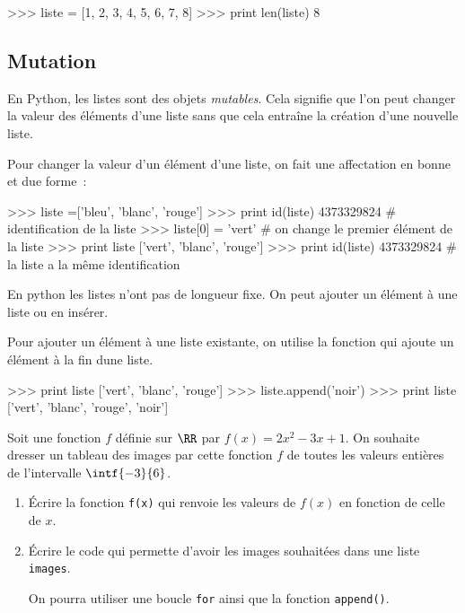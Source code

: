 \begin{pythoncode}
>>> liste = [1, 2, 3, 4, 5, 6, 7, 8]
>>> print len(liste)
8
\end{pythoncode}



\subsection{Mutation}
En Python, les listes sont des objets \textit{mutables}. Cela signifie que l'on peut changer la valeur des éléments d'une liste sans que cela entraîne la création d'une nouvelle liste.

Pour changer la valeur d'un élément d'une liste, on fait une affectation en bonne et due forme~:
\begin{pythoncode}
>>> liste =['bleu', 'blanc', 'rouge']
>>> print id(liste)
4373329824                           # identification de la liste
>>> liste[0] = 'vert'                # on change le premier élément de la liste
>>> print liste
['vert', 'blanc', 'rouge']
>>> print id(liste)
4373329824                           # la liste a la même identification
\end{pythoncode}


En python les listes n'ont pas de longueur fixe. On peut ajouter un élément à une liste ou en insérer.

Pour ajouter un élément à une liste existante, on utilise la fonction  qui ajoute un élément à la fin dune liste.
\begin{pythoncode}
>>> print liste
['vert', 'blanc', 'rouge']
>>> liste.append('noir')
>>> print liste
['vert', 'blanc', 'rouge', 'noir']
\end{pythoncode}

\begin{exercice}
\label{python:listes:exos:images}
Soit une fonction $f$ définie sur $\RR$ par $f(x) = 2x^2-3x+1$. On souhaite dresser un tableau
des images par cette fonction $f$ de toutes les valeurs entières de l'intervalle $\intf{-3}{6}$.
\begin{enumerate}
	\item Écrire la fonction \texttt{f(x)} qui renvoie les valeurs de $f(x)$ en fonction de celle de $x$.
\item Écrire le code qui permette d'avoir les images souhaitées dans une liste \texttt{images}.

On pourra utiliser une boucle \texttt{for} ainsi que la fonction \texttt{append()}.
\end{enumerate}
\end{exercice}

